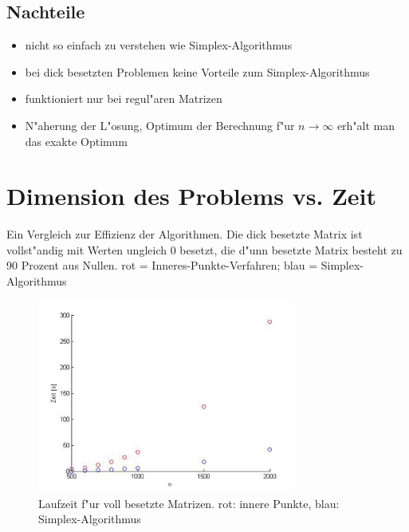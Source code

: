 \begin{refsection}
\subsection{Nachteile}
\begin{itemize}
	\item nicht so einfach zu verstehen wie Simplex-Algorithmus
	\item bei dick besetzten Problemen keine Vorteile zum Simplex-Algorithmus
	\item funktioniert nur bei regul"aren Matrizen
	\item N"aherung der L"osung, Optimum der Berechnung f"ur $n\to \infty$ erh"alt man das exakte Optimum
\end{itemize}

\newpage
\section{Dimension des Problems vs. Zeit}
Ein Vergleich zur Effizienz der Algorithmen. Die dick besetzte Matrix
ist vollst"andig mit Werten ungleich 0 besetzt, die d"unn besetzte Matrix
besteht zu 90 Prozent aus Nullen. rot = Inneres-Punkte-Verfahren; blau =
Simplex-Algorithmus

\begin{figure}
\begin{center}
\includegraphics[width=8.5cm]{./innerepunkte/dickbesetztematrix.pdf}
\end{center}
\caption{Laufzeit f"ur voll besetzte Matrizen.
{\color{red}rot}: innere Punkte, {\color{blue} blau}: Simplex-Algorithmus
\label{innerpunkte:performance-vollbesetzt}}
\end{figure}


\end{refsection}
